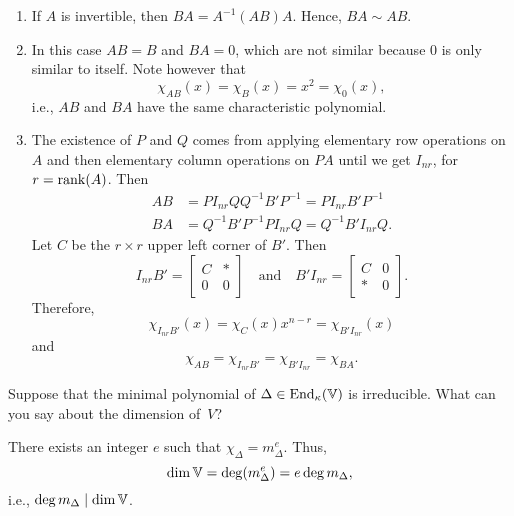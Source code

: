 \begin{solution}${}$
    \begin{enumerate}[\rm a)]
        \item If $A$ is invertible, then $BA = A^{-1}(AB)A$. Hence, $BA\sim AB$.

        \item In this case $AB=B$ and $BA=0$, which are not similar because $0$ is only similar to itself. Note however that
        $$
            \chi_{AB}(x)=\chi_B(x)=x^2=\chi_0(x),
        $$
        i.e., $AB$ and $BA$ have the same characteristic polynomial.

        \item The existence of $P$ and $Q$ comes from applying elementary row operations on $A$ and then elementary column operations on $PA$ until we get $I_{nr}$, for $r=\operatorname{rank}(A)$. Then
        \begin{align*}
            AB &= PI_{nr}QQ^{-1}B'P^{-1}=PI_{nr}B'P^{-1}\\
            BA &= Q^{-1}B'P^{-1}PI_{nr}Q=Q^{-1}B'I_{nr}Q.
        \end{align*}
        Let $C$ be the $r\times r$ upper left corner of $B'$. Then
        $$
            I_{nr}B' = \begin{bmatrix}
                C&*\\
                0&0
            \end{bmatrix}
            \quad\text{and}\quad
            B'I_{nr} = \begin{bmatrix}
                C&0\\
                *&0
            \end{bmatrix}.
        $$
        Therefore,
        $$
            \chi_{I_{nr}B'}(x) = \chi_C(x)x^{n-r}
                = \chi_{B'I_{nr}}(x)
        $$
        and
        $$
            \chi_{AB}=\chi_{I_{nr}B'}=\chi_{B'I_{nr}}=\chi_{BA}.
        $$
    \end{enumerate}
\end{solution}

\begin{exr}
    Suppose that the minimal polynomial of\/ $\Delta\in{\operatorname{End}}_\kappa(\mathbb V)$ is irreducible. What can you say about the dimension of\/~$V$?
\end{exr}

\begin{solution}
    There exists an integer $e$ such that $\chi_\Delta=m_\Delta^e$. Thus, 
    $$
        \dim\mathbb V=\deg(m_\Delta^e)=e\deg m_\Delta,
    $$
    i.e., $\deg m_\Delta\mid\dim\mathbb V$.
\end{solution}

